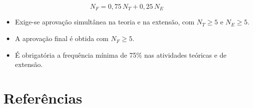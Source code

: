 \documentclass[11pt,a4paper]{article}
\begin{document}
\[
N_F = 0{,}75\,N_T + 0{,}25\,N_E
\]

\begin{itemize}[noitemsep]
  \item Exige-se aprovação simultânea na teoria e na extensão, com $N_T \geq 5$ e $N_E \geq 5$.
  \item A aprovação final é obtida com $N_F \geq 5$.
  \item É obrigatória a frequência mínima de 75\% nas atividades teóricas e de extensão.
\end{itemize}

\section{Referências}

\nocite{lathi2019modern, haykin2009communication, proakis2007fundamentals, couch2013digital, carlson2002communication, ziemer2015principles}
\printbibliography[heading=none]
\end{document}
